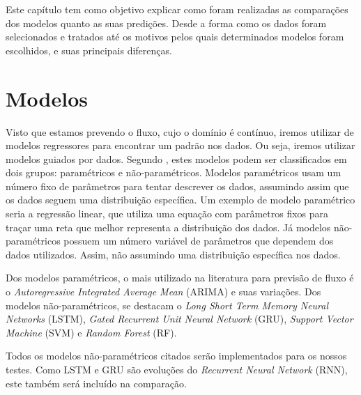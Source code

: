 




Este capítulo tem como objetivo explicar como foram realizadas as comparações dos modelos quanto as suas predições. Desde a forma como os dados foram selecionados e tratados até os motivos pelos quais determinados modelos foram escolhidos, e suas principais diferenças. 

\section{Modelos}




Visto que estamos prevendo o fluxo, cujo o domínio é contínuo, iremos utilizar de modelos regressores para encontrar um padrão nos dados. Ou seja, iremos utilizar modelos guiados por dados. Segundo \cite{parametric}, estes modelos podem ser classificados em dois grupos: paramétricos e não-paramétricos. Modelos paramétricos usam um número fixo de parâmetros para tentar descrever os dados, assumindo assim que os dados seguem uma distribuição específica. Um exemplo de modelo paramétrico seria a regressão linear, que utiliza uma equação com parâmetros fixos para traçar uma reta que melhor representa a distribuição dos dados. Já modelos não-paramétricos possuem um número variável de parâmetros que dependem dos dados utilizados. Assim, não assumindo uma distribuição específica nos dados.

Dos modelos paramétricos, o mais utilizado na literatura para previsão de fluxo é o \textit{Autoregressive Integrated Average Mean} (ARIMA) e suas variações. Dos modelos não-paramétricos, se destacam o \textit{Long Short Term Memory Neural Networks} (LSTM), \textit{Gated Recurrent Unit Neural Network} (GRU), \textit{Support Vector Machine} (SVM) e \textit{Random Forest} (RF). 

Todos os modelos não-paramétricos citados serão implementados para os nossos testes. Como LSTM e GRU são evoluções do \textit{Recurrent Neural Network} (RNN), este também será incluído na comparação. 

